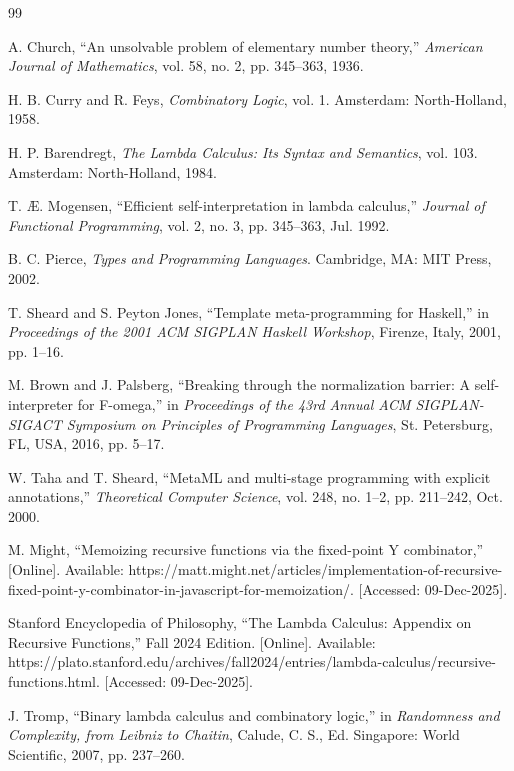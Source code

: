 \documentclass[11pt]{article}
\begin{document}
\begin{thebibliography}{99}

A. Church, ``An unsolvable problem of elementary number theory,'' \textit{American Journal of Mathematics}, vol. 58, no. 2, pp. 345--363, 1936.

H. B. Curry and R. Feys, \textit{Combinatory Logic}, vol. 1. Amsterdam: North-Holland, 1958.

H. P. Barendregt, \textit{The Lambda Calculus: Its Syntax and Semantics}, vol. 103. Amsterdam: North-Holland, 1984.

T. Æ. Mogensen, ``Efficient self-interpretation in lambda calculus,'' \textit{Journal of Functional Programming}, vol. 2, no. 3, pp. 345--363, Jul. 1992.

B. C. Pierce, \textit{Types and Programming Languages}. Cambridge, MA: MIT Press, 2002.

T. Sheard and S. Peyton Jones, ``Template meta-programming for Haskell,'' in \textit{Proceedings of the 2001 ACM SIGPLAN Haskell Workshop}, Firenze, Italy, 2001, pp. 1--16.

M. Brown and J. Palsberg, ``Breaking through the normalization barrier: A self-interpreter for F-omega,'' in \textit{Proceedings of the 43rd Annual ACM SIGPLAN-SIGACT Symposium on Principles of Programming Languages}, St. Petersburg, FL, USA, 2016, pp. 5--17.

W. Taha and T. Sheard, ``MetaML and multi-stage programming with explicit annotations,'' \textit{Theoretical Computer Science}, vol. 248, no. 1--2, pp. 211--242, Oct. 2000.

M. Might, ``Memoizing recursive functions via the fixed-point Y combinator,'' [Online]. Available: https://matt.might.net/articles/implementation-of-recursive-fixed-point-y-combinator-in-javascript-for-memoization/. [Accessed: 09-Dec-2025].

Stanford Encyclopedia of Philosophy, ``The Lambda Calculus: Appendix on Recursive Functions,'' Fall 2024 Edition. [Online]. Available: https://plato.stanford.edu/archives/fall2024/entries/lambda-calculus/recursive-functions.html. [Accessed: 09-Dec-2025].

J. Tromp, ``Binary lambda calculus and combinatory logic,'' in \textit{Randomness and Complexity, from Leibniz to Chaitin}, Calude, C. S., Ed. Singapore: World Scientific, 2007, pp. 237--260.

\end{thebibliography}
\end{document}
